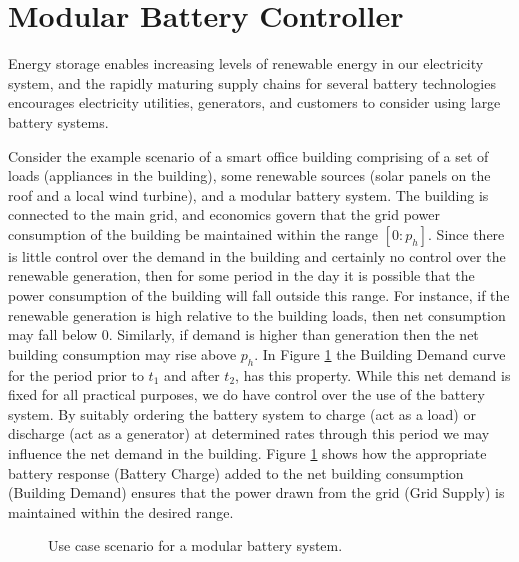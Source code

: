 \section{Modular Battery Controller}\label{sec:introduction}

Energy storage enables increasing levels of renewable energy in our electricity system, and the rapidly maturing supply chains for several battery technologies encourages electricity utilities, generators, and customers to consider using large battery systems. 

Consider the example scenario of a smart office building comprising of a set of loads (appliances in the building), some renewable sources (solar panels on the roof and a local wind turbine), and a modular battery system. The building is connected to the main grid, and economics govern that the grid power consumption of the building be maintained within the range $[0:p_h]$. Since there is little control over the demand in the building and certainly no control over the renewable generation, then for some period in the day it is possible that the power consumption of the building will fall outside this range. For instance, if the renewable generation is high relative to the building loads, then net consumption may fall below $0$. Similarly, if demand is higher than generation then the net building consumption may rise above $p_h$. In Figure \ref{fig:usecase} the Building Demand curve for the period prior to $t_1$ and after $t_2$, has this property. While this net demand is fixed for all practical purposes, we do have control over the use of the battery system. By suitably ordering the battery system to charge (act as a load) or discharge (act as a generator) at determined rates through this period we may influence the net demand in the building. Figure \ref{fig:usecase} shows how the appropriate battery response (Battery Charge) added to the net building consumption (Building Demand) ensures that the power drawn from the grid (Grid Supply) is maintained within the desired range.

\begin{figure}[ht]
\begin{center}

\end{center}
\caption{Use case scenario for a modular battery system.}
\label{fig:usecase}
\end{figure}

